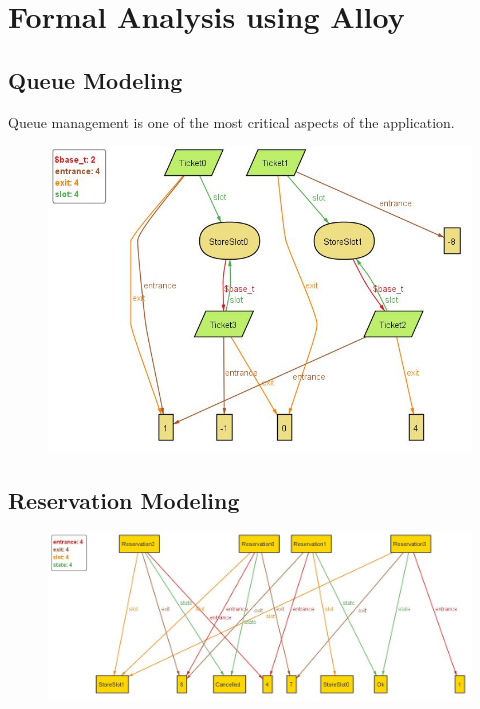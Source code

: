 \section{Formal Analysis using Alloy}
\subsection{Queue Modeling}
Queue management is one of the most critical aspects of the application.


\begin{figure}[H]
    \centering
    \includegraphics[width=1\textwidth]{alloy/Line_Alloy.JPG}
\end{figure}

\subsection{Reservation Modeling}

\begin{figure}[H]
    \centering
    \includegraphics[width=1\textwidth]{alloy/Reservation_Alloy.JPG}
\end{figure}
